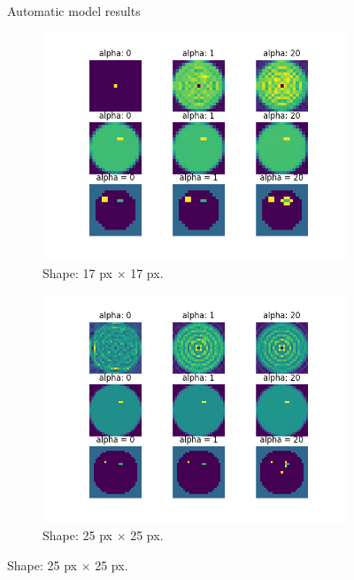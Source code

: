\documentclass{article}
\begin{document}
\vspace*{-0.1\baselineskip}
\begin{figure}[H]
  \centering
  \large{Automatic model results} \\
  \begin{subfigure}[b]{0.45\linewidth}
    \includegraphics[width=\linewidth]{images/total-picture-17-condA1-3.1025624256157716e+16-condA2-7.2959506476769125.png}
    \caption{Shape: 17 px $\times$ 17 px.}
    \label{fig:sub1}
  \end{subfigure}
  \begin{subfigure}[b]{0.45\linewidth}
    \includegraphics[width=\linewidth]{images/total-picture-25-condA1-inf-condA2-49.46075340640841.png}
    \caption{Shape: 25 px $\times$ 25 px.}

\end{subfigure}
\end{figure}
\end{document}
